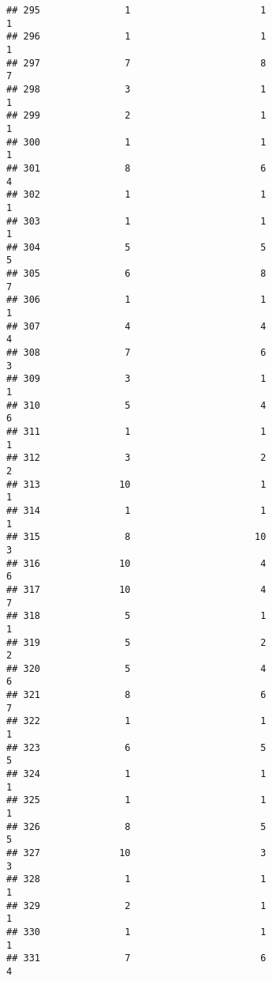 \documentclass[
]{article}
\begin{document}
\begin{verbatim}
## 295               1                       1                        1
## 296               1                       1                        1
## 297               7                       8                        7
## 298               3                       1                        1
## 299               2                       1                        1
## 300               1                       1                        1
## 301               8                       6                        4
## 302               1                       1                        1
## 303               1                       1                        1
## 304               5                       5                        5
## 305               6                       8                        7
## 306               1                       1                        1
## 307               4                       4                        4
## 308               7                       6                        3
## 309               3                       1                        1
## 310               5                       4                        6
## 311               1                       1                        1
## 312               3                       2                        2
## 313              10                       1                        1
## 314               1                       1                        1
## 315               8                      10                        3
## 316              10                       4                        6
## 317              10                       4                        7
## 318               5                       1                        1
## 319               5                       2                        2
## 320               5                       4                        6
## 321               8                       6                        7
## 322               1                       1                        1
## 323               6                       5                        5
## 324               1                       1                        1
## 325               1                       1                        1
## 326               8                       5                        5
## 327              10                       3                        3
## 328               1                       1                        1
## 329               2                       1                        1
## 330               1                       1                        1
## 331               7                       6                        4

\end{verbatim}
\end{document}
